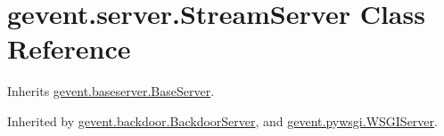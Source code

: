 \hypertarget{classgevent_1_1server_1_1_stream_server}{}\section{gevent.\+server.\+Stream\+Server Class Reference}
\label{classgevent_1_1server_1_1_stream_server}


Inherits \hyperlink{classgevent_1_1baseserver_1_1_base_server}{gevent.\+baseserver.\+Base\+Server}.



Inherited by \hyperlink{classgevent_1_1backdoor_1_1_backdoor_server}{gevent.\+backdoor.\+Backdoor\+Server}, and \hyperlink{classgevent_1_1pywsgi_1_1_w_s_g_i_server}{gevent.\+pywsgi.\+W\+S\+G\+I\+Server}.


